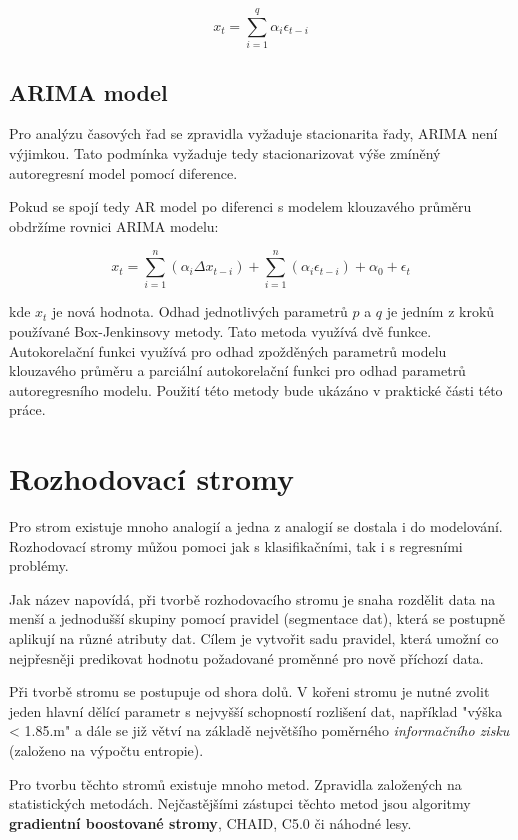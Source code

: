 \documentclass[FM,BP,fonts]{tulthesis}
\begin{document}
\begin{equation}
	x_t =  \sum_{i=1}^{q}\alpha_i\epsilon_{t-i}
\end{equation}


\subsection{ARIMA model}
Pro analýzu časových řad se zpravidla vyžaduje stacionarita řady, ARIMA není výjimkou. Tato podmínka vyžaduje tedy stacionarizovat výše zmíněný autoregresní model pomocí diference. 

Pokud se spojí tedy AR model po diferenci s modelem klouzavého průměru obdržíme rovnici ARIMA modelu: 

\begin{equation}
 x_t =    \sum_{i=1}^{n}(\alpha_i \Delta x_{t-i}) + \sum_{i=1}^{n}(\alpha_i\epsilon_{t-i}) + \alpha_0 + \epsilon_t
\end{equation}

kde $x_t$ je nová hodnota. Odhad jednotlivých parametrů $p$ a $q$ je jedním z kroků používané Box-Jenkinsovy metody. \cite{zayiong} Tato metoda využívá dvě funkce. Autokorelační funkci využívá pro odhad zpožděných parametrů modelu klouzavého průměru a parciální autokorelační funkci pro odhad parametrů autoregresního modelu. Použití této metody bude ukázáno v praktické části této práce.


\section{Rozhodovací stromy}
Pro strom existuje mnoho analogií a jedna z analogií se dostala i do modelování. Rozhodovací stromy můžou pomoci jak s klasifikačními, tak i s regresními problémy. 

Jak název napovídá, při tvorbě rozhodovacího stromu je snaha rozdělit data na menší a jednodušší skupiny pomocí pravidel (segmentace dat), která se postupně aplikují na různé atributy dat. Cílem je vytvořit sadu pravidel, která umožní co nejpřesněji predikovat hodnotu požadované proměnné pro nově příchozí data.

Při tvorbě stromu se postupuje od shora dolů. V kořeni stromu je nutné zvolit jeden hlavní dělící parametr s nejvyšší schopností rozlišení dat, například "výška < 1.85.m" a dále se již větví na základě největšího poměrného \textit{informačního zisku} (založeno na výpočtu entropie).  \cite{Tomsik2016thesis}

Pro tvorbu těchto stromů existuje mnoho metod. Zpravidla založených na statistických metodách. Nejčastějšími zástupci těchto metod jsou algoritmy \textbf{gradientní boostované stromy}, CHAID, C5.0 či náhodné lesy. \cite{Tomsik2016thesis}
\end{document}
